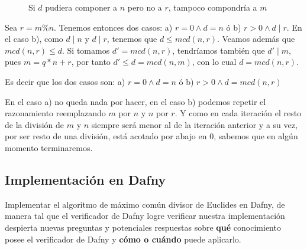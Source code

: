 \documentclass[12pt, a4paper, openany, fleqn]{book}
\begin{document}
\begin{figure}[h]
        \caption{Si $d$ pudiera componer a $n$ pero no a $r$, tampoco compondría a $m$}
        \label{varillas_euclides_mcd_del_resto}
    \end{figure}

    Sea $r = m \% n$. Tenemos entonces dos casos: a) $r = 0 \land d = n$ ó b) $r > 0 \land d \mid r $. En el caso b), como $d \mid n$ y $d \mid r$, tenemos que $d \leq mcd(n, r)$. Veamos además que $mcd(n,r) \leq d$. Si tomamos $d'=mcd(n,r)$, tendríamos también que $d' \mid m$, pues $m = q * n + r$, por tanto $d' \leqslant d = mcd(n,m)$, con lo cual $d = mcd(n,r)$.

    Es decir que los dos casos son: a) $r = 0 \land d = n$ ó b) $r > 0 \land d = mcd(n, r) $

    En el caso a) no queda nada por hacer, en el caso b) podemos repetir el razonamiento reemplazando $m$ por $n$ y $n$ por $r$. Y como en cada iteración el resto de la división de $m$ y $n$ siempre será menor al de la iteración anterior y a su vez, por ser resto de una división, está acotado por abajo en $0$, sabemos que en algún momento terminaremos.

    \subsection{Implementación en Dafny}
    Implementar el algoritmo de máximo común divisor de Euclides en Dafny, de manera tal que el verificador de Dafny logre verificar nuestra implementación despierta nuevas preguntas y potenciales respuestas sobre \textbf{qué} conocimiento posee el verificador de Dafny y \textbf{cómo o cuándo} puede aplicarlo.
\end{document}
